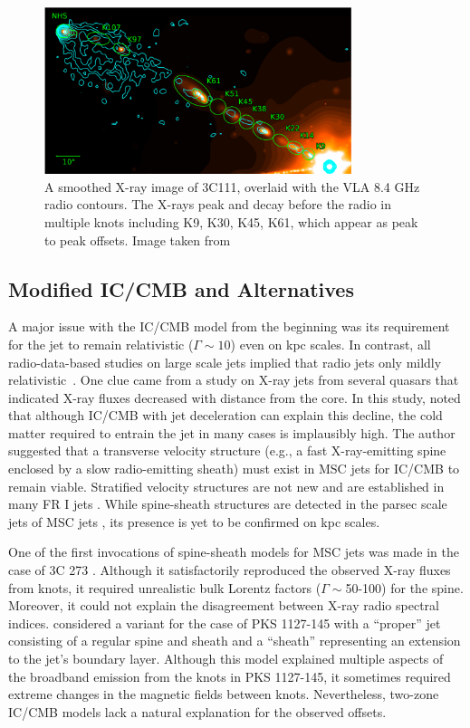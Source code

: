 \begin{figure}
    \centering
    \includegraphics[width=0.8\textwidth]{images/sources/3c111.png}
    \caption{A smoothed X-ray image of 3C111, overlaid with the VLA 8.4 GHz radio contours. The X-rays peak and decay before the radio in multiple knots including K9, K30, K45, K61, which appear as peak to peak offsets. Image taken from \citet{Clautice:2016zai}}
    \label{fig:3C111}
\end{figure}

\subsection{Modified IC/CMB and Alternatives}
A major issue with the IC/CMB model from the beginning was its requirement for the jet to remain relativistic  ($\Gamma\sim10$) even on kpc scales. In contrast, all radio-data-based studies on large scale jets implied that radio jets only mildly relativistic~\citep[$\Gamma\lesssim 1.5$, e.g., ][]{wardle1997fast,mullin2009bayesian}. One clue came from a study on X-ray jets from several quasars that indicated X-ray fluxes decreased with distance from the core. In this study, \citet{hardcastle2006testing} noted that although IC/CMB with jet deceleration can explain this decline, the cold matter required to entrain the jet in many cases is implausibly high. The author suggested that a transverse velocity structure (e.g., a fast X-ray-emitting spine enclosed by a slow radio-emitting sheath) must exist in MSC jets for IC/CMB to remain viable. Stratified velocity structures are not new and are established in many FR I jets \citep[e.g.,][]{laing2004adiabatic,canvin2004relativistic}. While spine-sheath structures are detected in the parsec scale jets of MSC jets \citep[e.g.,][]{2021A&A...654A..27B}, its presence is yet to be confirmed on kpc scales.

One of the first invocations of spine-sheath models for MSC jets was made in the case of 3C 273 \citep{jester2006new}. Although it satisfactorily reproduced the observed X-ray fluxes from knots, it required unrealistic bulk Lorentz factors ($\Gamma\sim $50-100) for the spine. Moreover, it could not explain the disagreement between X-ray radio spectral indices. \citet{siemiginowska2007300} considered a variant for the case of PKS 1127-145 with a ``proper'' jet consisting of a regular spine and sheath and a ``sheath'' representing an extension to the jet's boundary layer. Although this model explained multiple aspects of the broadband emission from the knots in PKS 1127-145, it sometimes required extreme changes in the magnetic fields between knots. Nevertheless, two-zone IC/CMB models lack a natural explanation for the observed offsets.

